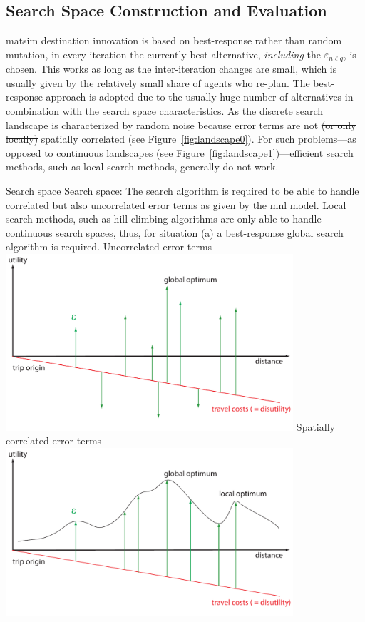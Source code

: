 \subsection{Search Space Construction and Evaluation}
\gls{matsim} destination innovation is based on best-response rather than random mutation, \ie in every iteration the currently best alternative{\orange , \emph{including} the $\varepsilon_{n \ell q}$, } is chosen. 
This works as long as the inter-iteration changes are small, which is usually given by the relatively small share of agents who re-plan. 
The best-response approach is adopted due to the usually huge number of alternatives in combination with the search space characteristics. 
As the discrete search landscape is characterized by random noise because error terms are not \st{(or only locally)} spatially correlated (see Figure~\ref{fig:landscape0}). For such problems---as opposed to continuous landscapes (see Figure~\ref{fig:landscape1})---efficient search methods, such as local search methods, generally do not work.

\createfigure%
{Search space}%
{Search space: The search algorithm is required to be able to handle correlated but also uncorrelated error terms as given by the \gls{mnl} model. Local search methods, such as hill-climbing algorithms are only able to handle continuous search spaces, thus, for situation (a) a best-response global search algorithm is required.}%
{\label{fig:landscape}}%
{%
  \createsubfigure%
  {Uncorrelated error terms}%
  {\includegraphics[width=0.8\textwidth,angle=0]{extending/figures/dc/landscape1.pdf}}%
  {\label{fig:landscape0}}%
  {}%
  \createsubfigure%
  {Spatially correlated error terms}%
	{\includegraphics[width=0.8\textwidth,angle=0]{extending/figures/dc/landscape0.pdf}}%
  {\label{fig:landscape1}}%
  {}%
}%
{}

